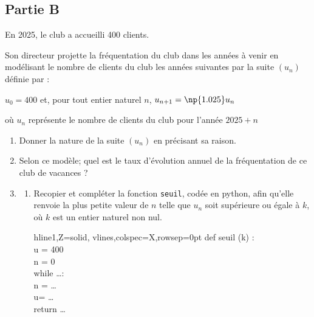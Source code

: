 \subsection*{Partie B}
En 2025, le club a accueilli 400 clients.

Son directeur projette la fréquentation du club dans les années à venir en modélisant le nombre de clients du club les années suivantes par la suite \mbox{$(u_n)$} définie par :

\begin{center}
	\mbox{$u_0=400$} \quad et, pour tout entier naturel $n$, \quad \mbox{$u_{n+1}=\np{1.025}u_n$}
\end{center}

où $u_n$ représente le nombre de clients du club pour l'année \mbox{$2025+n$}
\begin{enumerate}
	\item Donner la nature de la suite $(u_n)$ en précisant sa raison.
	\item Selon ce modèle; quel est le taux d'évolution annuel de la fréquentation de ce club de vacances ?
	\item
	 \begin{enumerate}
	\item
	\begin{minipage}[t]{0.66\linewidth}\vspace{0mm}
		Recopier et compléter la fonction \texttt{seuil}, codée en python, afin qu'elle renvoie la plus petite valeur de $n$ telle que $u_n$ soit supérieure ou égale à $k$, où $k$ est un entier naturel non nul.

\end{minipage}
\hspace{0.05\linewidth}
	\begin{minipage}[t]{0.33\linewidth}\vspace{0cm}
\begin{ttfamily}
\begin{tblr}{hline{1,Z}={solid}, vlines,colspec={X},rowsep=0pt}
	def seuil (k) :\\
	\qquad u = 400\\
	\qquad n = 0\\
	\qquad while  \dots :\\
	\qquad\qquad  n = \dots\\
	\qquad\qquad  u= \dots\\
	\qquad return \dots\\
\end{tblr}
\end{ttfamily}
\end{minipage}


\end{enumerate}
\end{enumerate}
